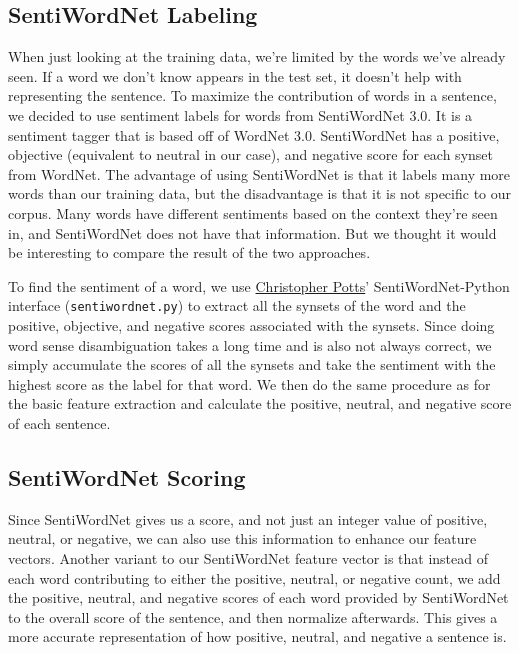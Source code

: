 \documentclass{article}
\begin{document}
\subsection{SentiWordNet Labeling}

When just looking at the training data, we're limited by the words we've already seen. If a word we don't know appears in the test set, it doesn't help with representing the sentence. To maximize the contribution of words in a sentence, we decided to use sentiment labels for words from SentiWordNet 3.0. It is a sentiment tagger that is based off of WordNet 3.0. SentiWordNet has a positive, objective (equivalent to neutral in our case), and negative score for each synset from WordNet. The advantage of using SentiWordNet is that it labels many more words than our training data, but the disadvantage is that it is not specific to our corpus. Many words have different sentiments based on the context they're seen in, and SentiWordNet does not have that information. But we thought it would be interesting to compare the result of the two approaches.

To find the sentiment of a word, we use \href{http://compprag.christopherpotts.net/wordnet.html}{Christopher Potts}' SentiWordNet-Python interface (\texttt{sentiwordnet.py}) to extract all the synsets of the word and the positive, objective, and negative scores associated with the synsets. Since doing word sense disambiguation takes a long time and is also not always correct, we simply accumulate the scores of all the synsets and take the sentiment with the highest score as the label for that word. We then do the same procedure as for the basic feature extraction and calculate the positive, neutral, and negative score of each sentence.

\subsection{SentiWordNet Scoring}
Since SentiWordNet gives us a score, and not just an integer value of positive, neutral, or negative, we can also use this information to enhance our feature vectors. Another variant to our SentiWordNet feature vector is that instead of each word contributing to either the positive, neutral, or negative count, we add the positive, neutral, and negative scores of each word provided by SentiWordNet to the overall score of the sentence, and then normalize afterwards. This gives a more accurate representation of how positive, neutral, and negative a sentence is.
\end{document}
